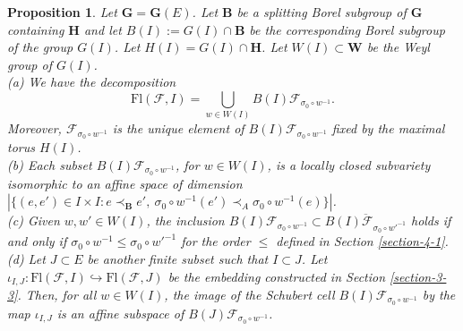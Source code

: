 \documentclass[12pt]{amsart}
\newtheorem{proposition}{Proposition}
\theoremstyle{definition}
\begin{document}
\begin{proposition}
\label{proposition-11-new}
Let $\mathbf{G}=\mathbf{G}(E)$.
Let $\mathbf{B}$ be a splitting Borel subgroup of $\mathbf{G}$ containing $\mathbf{H}$ and let $B(I):=G(I)\cap\mathbf{B}$ be the corresponding Borel subgroup of the group $G(I)$. Let $H(I)=G(I)\cap\mathbf{H}$. Let $W(I)\subset\mathbf{W}$ be the Weyl group of $G(I)$. \\
{\rm (a)} We have the decomposition
\[\mathrm{Fl}(\mathcal{F},I)=\bigcup_{w\in W(I)}B(I)\mathcal{F}_{\sigma_0\circ w^{-1}}.\]
Moreover, $\mathcal{F}_{\sigma_0\circ w^{-1}}$ is the unique element of $B(I)\mathcal{F}_{\sigma_0\circ w^{-1}}$ fixed by the maximal torus $H(I)$. \\
{\rm (b)} Each subset $B(I)\mathcal{F}_{\sigma_0\circ w^{-1}}$, for $w\in W(I)$, is a locally closed subvariety isomorphic to an affine space of dimension $|\{(e,e')\in I\times I:e\prec_\mathbf{B}e',\ \sigma_0\circ w^{-1}(e')\prec_A\sigma_0\circ w^{-1}(e)\}|$. \\
{\rm (c)} Given $w,w'\in W(I)$, the inclusion $B(I)\mathcal{F}_{\sigma_0\circ w^{-1}}\subset
\overline{B(I)\mathcal{F}_{\sigma_0\circ w'^{-1}}}$ holds if and only if $\sigma_0\circ w^{-1}\leq\sigma_0\circ w'^{-1}$ for the order $\leq$ defined in Section \ref{section-4-1}. \\
{\rm (d)} Let $J\subset E$ be another finite subset such that $I\subset J$. Let $\iota_{I,J}:\mathrm{Fl}(\mathcal{F},I)\hookrightarrow\mathrm{Fl}(\mathcal{F},J)$ be the embedding constructed in Section \ref{section-3-3}.
Then, for all $w\in W(I)$, the image of the Schubert cell $B(I)\mathcal{F}_{\sigma_0\circ w^{-1}}$ by the map $\iota_{I,J}$ is an affine subspace of $B(J)\mathcal{F}_{\sigma_0\circ w^{-1}}$.
\end{proposition}
\end{document}
